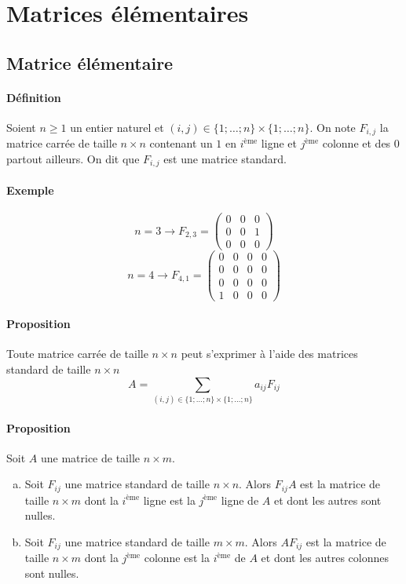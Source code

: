 %
%
\section{Matrices élémentaires}
%
%

%
\subsection{Matrice élémentaire}
%
\paragraph{Définition} Soient $n \geq 1$ un entier naturel et $(i, j) \in \{1; \ldots; n\} \times \{1; \ldots; n\}$. On note $F_{i, j}$ la matrice carrée de taille $n \times n$ contenant un $1$ en $i^{\text{ème}}$ ligne et $j^{\text{ème}}$ colonne et des $0$ partout ailleurs. On dit que $F_{i, j}$ est une matrice standard.

\paragraph{Exemple} 
$$n = 3 \rightarrow F_{2,3} = 
\begin{pmatrix}
  0 & 0 & 0 \\
  0 & 0 & 1 \\
  0 & 0 & 0
\end{pmatrix}$$
$$n = 4 \rightarrow F_{4,1} = 
\begin{pmatrix}
  0 & 0 & 0 & 0 \\
  0 & 0 & 0 & 0 \\
  0 & 0 & 0 & 0 \\
  1 & 0 & 0 & 0
\end{pmatrix}$$

\paragraph{Proposition} Toute matrice carrée de taille $n \times n$ peut s'exprimer à l'aide des matrices standard de taille $n\times n$
$$A = \sum_{(i, j) \in \{1; \ldots; n\}\times\{1; \ldots; n\}} a_{ij} F_{ij}$$

\paragraph{Proposition} Soit $A$ une matrice de taille $n\times m$.
\begin{enumerate}[a)]
  \item Soit $F_{ij}$ une matrice standard de taille $n\times n$. Alors $F_{ij} A$ est la matrice de taille $n \times m$ dont la $i^{\text{ème}}$ ligne est la $j^{\text{ème}}$ ligne de $A$ et dont les autres sont nulles.
  \item Soit $F_{ij}$ une matrice standard de taille $m\times m$. Alors $A F_{ij}$ est la matrice de taille $n\times m$ dont la $j^{\text{ème}}$ colonne est la $i^{\text{ème}}$ de $A$ et dont les autres colonnes sont nulles.
\end{enumerate}

